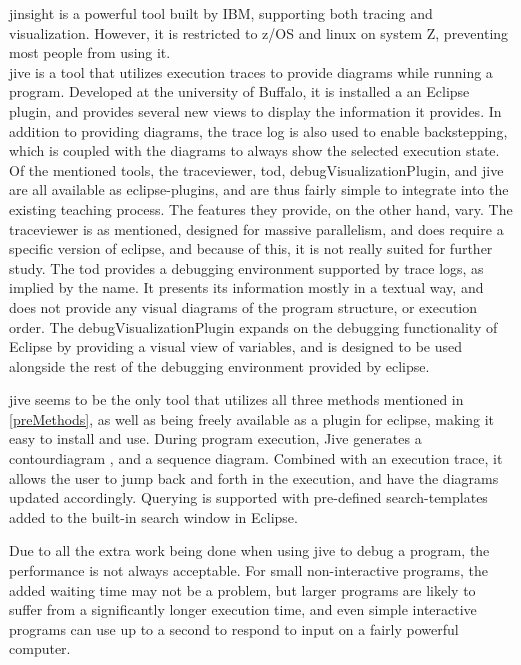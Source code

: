 \Gls{jinsight} \cite{Pauw} is a powerful tool built by IBM, supporting both tracing and visualization.
However, it is restricted to z/OS and linux on system Z, preventing most people from using it.
~\\

\Gls{jive} is a tool that utilizes execution traces to provide diagrams while running a program.
Developed at the university of Buffalo, it is installed a an Eclipse plugin, and provides several new views to display the information it provides.
In addition to providing diagrams, the trace log is also used to enable backstepping, which is coupled with the diagrams to always show the selected execution state.
~\\

Of the mentioned tools, the \gls{traceviewer}, \gls{tod}, \gls{debugVisualizationPlugin}, and \gls{jive} are all available as eclipse-plugins, and are thus fairly simple to integrate into the existing teaching process.
The features they provide, on the other hand, vary.
The \gls{traceviewer} is as mentioned, designed for massive parallelism, and does require a specific version of eclipse, and because of this, it is not really suited for further study.%
The \gls{tod} provides a debugging environment supported by trace logs, as implied by the name.
It presents its information mostly in a textual way, and does not provide any visual diagrams of the program structure, or execution order.
The \gls{debugVisualizationPlugin} expands on the debugging functionality of Eclipse by providing a visual view of variables, and is designed to be used alongside the rest of the debugging environment provided by eclipse.
~\\

\begin{sloppypar}
\Gls{jive} seems to be the only tool that utilizes all three methods mentioned in \autoref{preMethods}, as well as being freely available as a plugin for eclipse, making it easy to install and use.
During program execution, Jive generates a \gls{contourdiagram} \cite{Jayaraman1996}, and a sequence diagram.
Combined with an execution trace, it allows the user to jump back and forth in the execution, and have the diagrams updated accordingly.
Querying is supported with pre-defined search-templates added to the built-in search window in Eclipse.
~\\
\end{sloppypar}

Due to all the extra work being done when using jive to debug a program, the performance is not always acceptable.
For small non-interactive programs, the added waiting time may not be a problem, but larger programs are likely to suffer from a significantly longer execution time, and even simple interactive programs can use up to a second to respond to input on a fairly powerful computer.
~\\





